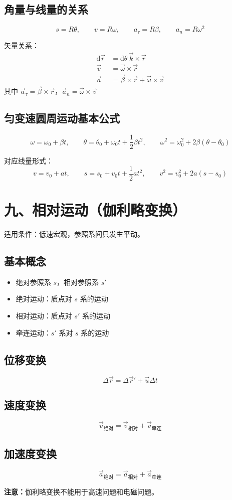 \documentclass{ctexart}
\begin{document}
\subsection*{角量与线量的关系}
\[
s = R\theta,\qquad v = R\omega,\qquad
a_{\tau} = R\beta,\qquad a_{n} = R\omega^{2}
\]

矢量关系：
\begin{align*}
\mathrm{d}\vec{r} &= \mathrm{d}\theta\,\vec{k} \times \vec{r} \\
\vec{v} &= \vec{\omega} \times \vec{r} \\
\vec{a} &= \vec{\beta} \times \vec{r} + \vec{\omega} \times \vec{v}
\end{align*}
其中 $\vec{a}_{\tau} = \vec{\beta} \times \vec{r}$，$\vec{a}_{n} = \vec{\omega} \times \vec{v}$

\subsection*{匀变速圆周运动基本公式}
\[
\omega = \omega_0 + \beta t,\qquad
\theta = \theta_0 + \omega_0 t + \frac12\beta t^{2},\qquad
\omega^{2} = \omega_0^{2} + 2\beta(\theta - \theta_0)
\]

对应线量形式：
\[
v = v_0 + at,\qquad
s = s_0 + v_0 t + \frac12 at^{2},\qquad
v^{2} = v_0^{2} + 2a(s - s_0)
\]

\section*{九、相对运动（伽利略变换）}

适用条件：低速宏观，参照系间只发生平动。

\subsection*{基本概念}
\begin{itemize}
  \item 绝对参照系 $s$，相对参照系 $s'$
  \item 绝对运动：质点对 $s$ 系的运动
  \item 相对运动：质点对 $s'$ 系的运动
  \item 牵连运动：$s'$ 系对 $s$ 系的运动
\end{itemize}

\subsection*{位移变换}
\[
\Delta\vec{r} = \Delta\vec{r}' + \vec{u}\Delta t
\]

\subsection*{速度变换}
\[
\vec{v}_{\text{绝对}} = \vec{v}_{\text{相对}} + \vec{v}_{\text{牵连}}
\]

\subsection*{加速度变换}
\[
\vec{a}_{\text{绝对}} = \vec{a}_{\text{相对}} + \vec{a}_{\text{牵连}}
\]

\textbf{注意：}伽利略变换不能用于高速问题和电磁问题。
\end{document}
